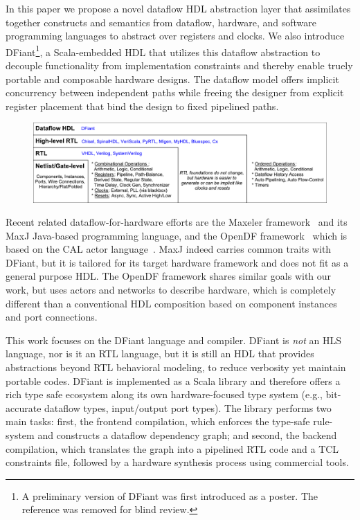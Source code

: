 In this paper we propose a novel dataflow HDL abstraction layer that assimilates together constructs and semantics from dataflow\cite{le1986signal, Thuau1991}, hardware, and software programming languages to abstract over registers and clocks. We also introduce DFiant\footnote{A preliminary version of DFiant was first introduced as a poster. The reference was removed for blind review.}, a Scala-embedded HDL that utilizes this dataflow abstraction to decouple functionality from implementation constraints and thereby enable truely portable and composable hardware designs. The dataflow model offers implicit concurrency between independent paths while freeing the designer from explicit register placement that bind the design to fixed pipelined paths.  

\begin{figure}[t]
	\centering
	\captionsetup{justification=centering}
	\includegraphics[width=\linewidth]{graphics/motivation.pdf} 
	\label{fig:motivation}
\end{figure}

Recent related dataflow-for-hardware efforts are the Maxeler framework~\cite{Pell2011} and its MaxJ Java-based programming language, and the OpenDF framework~\cite{bhattacharyya2008opendf} which is based on the CAL actor language~\cite{eker2003cal}. MaxJ indeed carries common traits with DFiant, but it is tailored for its target hardware framework and does not fit as a general purpose HDL. The OpenDF framework shares similar goals with our work, but uses actors and networks to describe hardware, which is completely different than a conventional HDL composition based on component instances and port connections.

This work focuses on the DFiant language and compiler. DFiant is \emph{not} an HLS language, nor is it an RTL language, but it is still an HDL that provides abstractions beyond RTL behavioral modeling, to reduce verbosity yet maintain portable codes.
DFiant is implemented as a Scala library and therefore offers a rich type safe ecosystem along its own hardware-focused type system (e.g., bit-accurate dataflow types, input/output port types). The library performs two main tasks: first, the frontend compilation, which enforces the type-safe rule-system and constructs a dataflow dependency graph; and second, the backend compilation, which translates the graph into a pipelined RTL code and a TCL constraints file, followed by a hardware synthesis process using commercial tools. 

